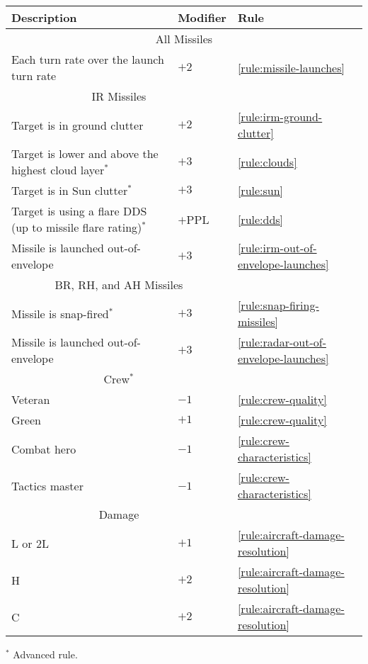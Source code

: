 {\begin{twocolumntable}
\begin{tabularx}{0.7\linewidth}{Xll}
\toprule
Description&Modifier&Rule\\
\midrule
\multicolumn{3}{c}{All Missiles}\\
\midrule
Each turn rate over the launch turn rate&$+2$&\ref{rule:missile-launches}\\
\midrule
\multicolumn{2}{c}{IR Missiles}\\
\midrule
Target is in ground clutter&$+2$&\ref{rule:irm-ground-clutter}\\
Target is lower and above the highest cloud layer$^*$&$+3$&\ref{rule:clouds}
\\
Target is in Sun clutter$^*$&$+3$&\ref{rule:sun}\\
Target is using a flare DDS (up to missile flare rating)$^*$&$+$PPL&\ref{rule:dds}\\
Missile is launched out-of-envelope&$+3$&\ref{rule:irm-out-of-envelope-launches}\\
\midrule
\multicolumn{2}{c}{BR, RH, and AH Missiles}\\
\midrule
Missile is snap-fired$^*$&$+3$&\ref{rule:snap-firing-missiles}\\
Missile is launched out-of-envelope&$+3$&\ref{rule:radar-out-of-envelope-launches}\\
\midrule
\multicolumn{2}{c}{Crew$^*$}\\
\midrule
Veteran&$-1$&\ref{rule:crew-quality}\\
Green&$+1$&\ref{rule:crew-quality}\\
Combat hero&$-1$&\ref{rule:crew-characteristics}\\
Tactics master&$-1$&\ref{rule:crew-characteristics}\\
\midrule
\multicolumn{2}{c}{Damage}\\
\midrule
L or 2L&$+1$&\ref{rule:aircraft-damage-resolution}\\
H&$+2$&\ref{rule:aircraft-damage-resolution}\\
C&$+2$&\ref{rule:aircraft-damage-resolution}\\
\bottomrule
\end{tabularx}
\begin{tablenote}{0.7\linewidth}
$^*$ Advanced rule.
\end{tablenote}
\end{twocolumntable}
}

